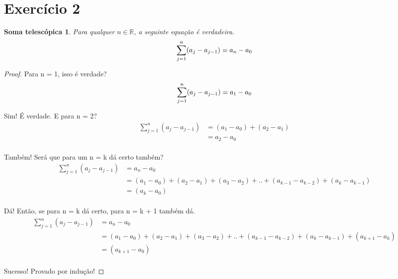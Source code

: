 \documentclass{article}
\begin{document}
\section{Exercício 2}

\newtheorem{soma_tele}{Soma telescópica}
\begin{soma_tele}
    Para qualquer $n \in  \mathbb{R}$, a seguinte equação é verdadeira.
	\begin{equation}
		\sum\limits_{j=1}^{n}(a_j - a_{j-1}) = a_n - a_0\\
	\end{equation}	

\end{soma_tele}


\begin{proof}
	Para n = 1, isso é verdade?
\begin{equation}
	\sum\limits_{j=1}^{n}(a_j - a_{j-1}) = a_1 - a_0 \\
\end{equation}

	Sim! É verdade. E para n = 2?
\begin{equation}
\begin{split}
	\sum\limits_{j=1}^{n}(a_j - a_{j-1}) & = (a_1 - a_0) + ( a_2 - a_1)\\
	& = a_2 - a_0 \\
\end{split}
\end{equation}

	Também! Será que para um n = k dá certo também?
\begin{equation}
\begin{split}
	\sum\limits_{j=1}^{n}(a_j - a_{j-1}) & = a_n - a_0 \\
	& = (a_1 - a_0) + ( a_2 - a_1) + (a_3 - a_2) + .. + (a_{k-1} - a_{k-2}) + (a_k - a_{k-1})\\
	& = (a_k - a_0)\\
\end{split}
\end{equation}

	Dá! Então, se para n = k dá certo, para n = k + 1 também dá.
\begin{equation}
\begin{split}
	\sum\limits_{j=1}^{n}(a_j - a_{j-1}) & = a_n - a_0 \\
	& = (a_1 - a_0) + ( a_2 - a_1) + (a_3 - a_2) + .. + (a_{k-1} - a_{k-2}) + (a_k - a_{k-1}) + (a_{k+1} - a_k)\\
	& = (a_{k+1} - a_0)\\	
\end{split}
\end{equation}

	Sucesso! Provado por indução!
\end{proof}
\end{document}
